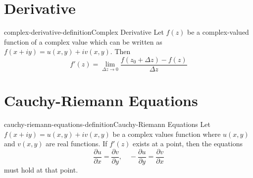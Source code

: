 \documentclass[preview]{standalone}
\begin{document}
  
\genpage

\section{Derivative}

\begin{snippetdefinition}{complex-derivative-definition}{Complex Derivative}
    Let \(f(z)\) be a complex-valued function
    of a complex value which can be written as
    \(f(x+iy)=u(x,y)+iv(x,y)\). Then
    \[
        f'(z) = \lim_{\Delta z \to 0} \frac{f(z_0 + \Delta z)-f(z)}{\Delta z}
    \]
\end{snippetdefinition}

\section{Cauchy-Riemann Equations}

\begin{snippetdefinition}{cauchy-riemann-equations-definition}{Cauchy-Riemann Equations}
    Let \(f(x+iy)=u(x,y)+iv(x,y)\) be a complex values function
    where \(u(x,y)\) and \(v(x,y)\) are real functions.
    If \(f'(z)\) exists at a point, then the equations
    \[
        \frac{\partial u}{\partial x}=\frac{\partial v}{\partial y},
        \quad
        -\frac{\partial u}{\partial y}=\frac{\partial v}{\partial x}
    \]
    must hold at that point.
\end{snippetdefinition}
\end{document}
